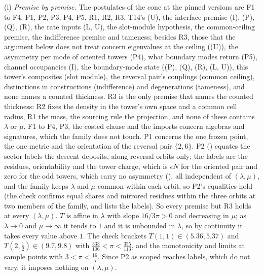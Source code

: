 (i) \emph{Premise by premise.} The postulates of the cone at the pinned versions are F1 to F4, P1, P2, P3, P4, P5, R1, R2, R3, T14's (U), the interface premise (I), (P), (Q), (R), the rate inputs (L, U), the slot-module hypothesis, the common-ceiling premise, the indifference premise and tameness; besides R3, those that the argument below does not treat concern eigenvalues at the ceiling ((U)), the asymmetry per mode of oriented towers (P4), what boundary modes return (P5), channel occupancies (I), the boundary-mode state ((P), (Q), (R), (L, U)), this tower's composites (slot module), the reversal pair's couplings (common ceiling), distinctions in constructions (indifference) and degenerations (tameness), and none names a counted thickness. R3 is the only premise that names the counted thickness: R2 fixes the density in the tower's own space and a common cell radius, R1 the mass, the sourcing rule the projection, and none of these contains $\lambda$ or $\mu$. F1 to F4, P3, the costed clause and the imports concern algebras and signatures, which the family does not touch. P1 concerns the one frozen point, the one metric and the orientation of the reversal pair $\{2, 6\}$. P2 () equates the sector labels the descent deposits, along reversal orbits only; the labels are the residues, orientability and the tower charge, which is $\epsilon N$ for the oriented pair and zero for the odd towers, which carry no asymmetry (), all independent of $(\lambda, \mu)$, and the family keeps $\lambda$ and $\mu$ common within each orbit, so P2's equalities hold (the check confirms equal shares and mirrored residues within the three orbits at two members of the family, and lists the labels). So every premise but R3 holds at every $(\lambda, \mu)$. $T$ is affine in $\lambda$ with slope $16/3\pi > 0$ and decreasing in $\mu$; as $\lambda \to 0$ and $\mu \to \infty$ it tends to $1$ and it is unbounded in $\lambda$, so by continuity it takes every value above $1$. The check brackets $T(1,1) \in (5.36, 5.37)$ and $T(2, \tfrac12) \in (9.7, 9.8)$ with $\tfrac{333}{106} < \pi < \tfrac{355}{113}$, and the monotonicity and limits at sample points with $3 < \pi < \tfrac{16}{5}$. Since P2 as scoped reaches labels, which do not vary, it imposes nothing on $(\lambda,\mu)$.

